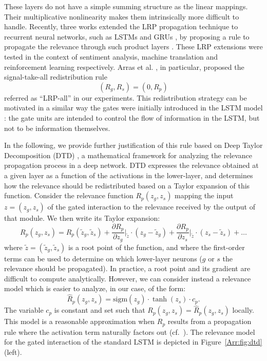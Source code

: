 \documentclass[runningheads]{llncs}
\begin{document}
These layers do not have a simple summing structure as the linear mappings. Their multiplicative nonlinearity makes them intrinsically more difficult to handle. Recently, three works extended the LRP propagation technique to recurrent neural networks, such as LSTMs \cite{Arr:Hochreiter:97} and GRUs \cite{Arr:Cho:EMNLP2014}, by proposing a rule to propagate the relevance through such product layers \cite{Arr:Arjona-Medina:18,Arr:Arras:17,Arr:Ding:ACL2017}. These LRP extensions were tested in the context of sentiment analysis, machine translation and reinforcement learning respectively. Arras et al. \cite{Arr:Arras:17}, in particular, proposed the signal-take-all redistribution rule
$$
(R_g,R_s) = (0,R_p)
$$
referred as ``LRP-all'' in our experiments. This redistribution strategy can be motivated in a similar way the gates were initially introduced in the LSTM model \cite{Arr:Hochreiter:97}: the gate units are intended to  control the flow of information in the LSTM, but not to be information themselves.

\medskip

In the following, we provide further justification of this rule based on Deep Taylor Decomposition (DTD) \cite{Arr:Montavon:PR2017}, a mathematical framework for analyzing the relevance propagation process in a deep network. DTD expresses the relevance obtained at a given layer as a function of the activations in the lower-layer, and determines how the relevance should be redistributed based on a Taylor expansion of this function.
Consider the relevance function $R_p(z_g,z_s)$ mapping the input $z=(z_g,z_s)$ of the gated interaction to the relevance received by the output of that module. We then write its Taylor expansion:
$$
R_p(z_g,z_s) = R_p(\widetilde{z}_g,\widetilde{z}_s)
+ \frac{\partial R_p}{\partial z_g}\Big|_{\widetilde{z}}
\cdot (z_g - \widetilde{z}_g)
+ \frac{\partial R_p}{\partial z_s}\Big|_{\widetilde{z}}
\cdot (z_s - \widetilde{z}_s)
+ \dots
$$
where $\widetilde{z} = (\widetilde{z}_g,\widetilde{z}_s)$ is a root point of the function, and where the first-order terms can be used to determine on which lower-layer neurons ($g$ or $s$ the relevance should be propagated). In practice, a root point and its gradient are difficult to compute analytically. However, we can consider instead a relevance model \cite{Arr:Montavon:PR2017} which is easier to analyze, in our case, of the form:
$$
\widehat{R}_p(z_g,z_s) = \mathrm{sigm}(z_g) \cdot \tanh(z_s) \cdot c_p.
$$
The variable $c_p$ is constant and set such that ${R}_p(z_g,z_s)=\widehat{R}_p(z_g,z_s)$ locally. This model is a reasonable approximation when $R_p$ results from a propagation rule where the activation term naturally factors out (cf.\ \cite{Arr:Montavon:PR2017}). The relevance model for the gated interaction of the standard LSTM is depicted in Figure~\ref{Arr:fig:dtd} (left).
\end{document}
